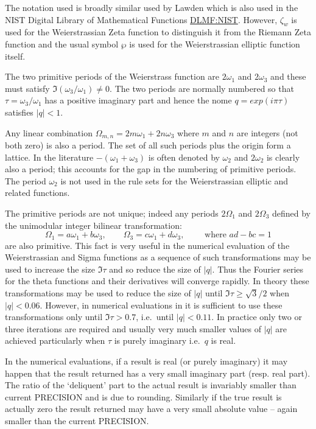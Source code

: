 The notation used is broadly similar used by Lawden \cite{Lawden:89} which is also used in the
NIST Digital Library of Mathematical Functions \href{https://dlmf.nist.gov/}{DLMF:NIST}. However,
$\zeta_w$ is used for the Weierstrassian Zeta function to distinguish it from the Riemann Zeta
function and the usual symbol $\wp$ is used for the Weierstrassian elliptic function itself.

The two primitive periods of the Weierstrass function are $2\omega_1$ and $2\omega_3$ and these must satisfy
$\Im(\omega_3/\omega_1) \neq 0$. The two periods are normally numbered so that $\tau = \omega_3/\omega_1$ has
a positive imaginary part and hence the nome $q = exp(i\pi\tau)$ satisfies $|q| <1$.

Any linear combination $\Omega_{m,n} = 2m\omega_1 +2n\omega_3$ where $m$ and $n$ are
integers (not both zero) is also a period. The set of all such periods plus the origin form a lattice. In the literature
$-(\omega_1+\omega_3)$ is often denoted by $\omega_2$ and $2\omega_2$ is clearly also a period; this
accounts for the gap in the numbering of primitive periods. The period $\omega_2$ is not used in \REDUCE the rule sets for
the Weierstrassian elliptic and related functions.

The primitive periods are not unique;
indeed any periods $2\Omega_1$ and $2\Omega_3$ defined by the unimodular integer bilinear transformation:
\[\Omega_1 = a\omega_1 + b\omega_3,\qquad\Omega_3 = c\omega_1 + d\omega_3,\qquad\text{ where }ad-bc = 1\]
are also primitive. This fact is very useful in the numerical evaluation of the Weierstrassian and Sigma
functions as a sequence of such transformations may be used to increase the size $\Im \tau$ and so reduce
the size of $|q|$. Thus the Fourier series for the theta functions and their derivatives will converge rapidly.
In theory these transformations may be used to reduce the size of $|q|$ until $\Im \tau \geq \sqrt 3/2$ when
$|q|<0.06$. However, in numerical evaluations in \REDUCE it is sufficient to use these transformations only until
$\Im \tau > 0.7$, i.e.~until $|q| < 0.11$. In practice only two or three iterations are required
and usually very much smaller values of $|q|$ are achieved particularly when $\tau$ is purely imaginary i.e.~$q$ is real.

In the numerical evaluations, if a result is real (or purely imaginary) it may
happen that the result returned has a very small imaginary part
(resp. real part). The ratio of the `deliquent' part to the actual result is
invariably smaller than current PRECISION and is due to rounding. Similarly if
the true result is actually zero the result returned may have a very small
absolute value -- again smaller than the current PRECISION.

